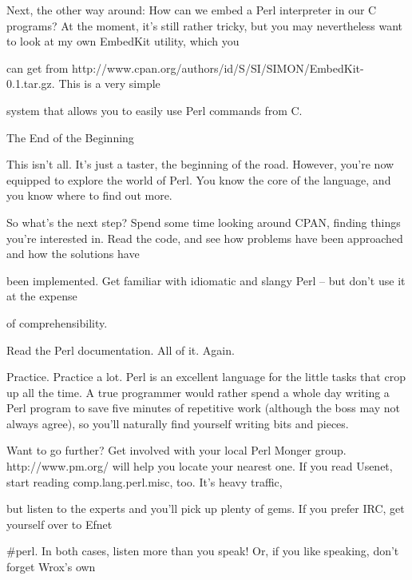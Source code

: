 \documentclass[a4paper,11pt]{book}
\begin{document}
\noindent Next, the other way around: How can we embed a Perl interpreter in our C programs? At the moment, it's still rather tricky, but you may nevertheless want to look at my own EmbedKit utility, which you

\noindent can get from http://www.cpan.org/authors/id/S/SI/SIMON/EmbedKit-0.1.tar.gz. This is a very simple

\noindent system that allows you to easily use Perl commands from C.

\noindent 

\noindent 

\noindent The End of the Beginning

\noindent 

\noindent This isn't all. It's just a taster, the beginning of the road. However, you're now equipped to explore the world of Perl. You know the core of the language, and you know where to find out more.

\noindent 

\noindent So what's the  next step?  Spend  some  time  looking  around  CPAN,  finding  things  you're  interested in.  Read the code,  and see  how  problems  have  been  approached  and  how  the solutions  have

\noindent been implemented.  Get familiar  with  idiomatic  and  slangy  Perl  --  but don't  use it  at  the expense

\noindent of comprehensibility.

\noindent 

\noindent Read the Perl documentation. All of it. Again.

\noindent 

\noindent Practice. Practice a lot. Perl is an excellent language for the little tasks that crop up all the time. A true programmer would rather spend a whole day writing a Perl program to save five minutes of repetitive work (although the boss may not always agree), so you'll naturally find yourself writing bits and pieces.

\noindent 

\noindent Want to go further? Get involved with your local Perl Monger group. http://www.pm.org/ will help you locate your nearest one. If you read Usenet, start reading comp.lang.perl.misc, too. It's heavy traffic,

\noindent but listen to the experts and you'll pick up plenty of gems. If you prefer IRC, get yourself over to Efnet

\noindent \#perl. In both cases, listen more than you speak! Or, if you like speaking, don't forget Wrox's own
\end{document}
